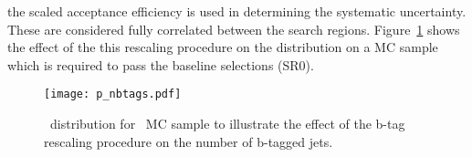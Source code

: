 the scaled acceptance efficiency is used in determining the systematic
uncertainty. These are considered fully correlated between the search regions.
Figure~\ref{fig:eff_nbtags} shows the effect of the this rescaling procedure on the
\nbtags distribution on a \ttW MC sample which is required to pass the baseline
selections (SR0).
\begin{figure}[!htb]
\begin{center}
\texttt{[image: p\_nbtags.pdf]}
\end{center}
\caption[\nbtags~distribution for \ttW~MC sample to illustrate the effect of the b-tag rescaling procedure]
{\label{fig:eff_nbtags}
\nbtags~distribution for \ttW~MC sample to illustrate the effect of the b-tag
rescaling procedure on the number of b-tagged jets.
}
\end{figure}
